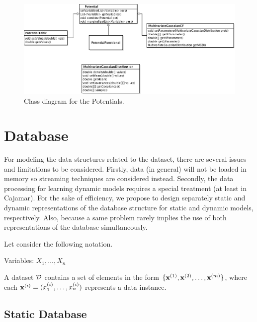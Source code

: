 \documentclass[a4paper,12pt]{article}
\begin{document}
\begin{figure}[h]
\includegraphics[width=\textwidth]{Potential}
\caption{Class diagram for the Potentials.}
\label{fig:classDiagramPotentials}
\end{figure}


\section{Database}

For modeling the data structures related to the dataset, there are several issues 
and limitations to be considered. Firstly, data (in general) will not be loaded in memory so streaming
techniques are considered instead. 
Secondly, the data processing for learning dynamic models requires a special treatment (at least in Cajamar).
For the sake of efficiency, we propose to design separately static and 
dynamic representations of the database structure for static and dynamic models, respectively. 
Also, because a same problem rarely implies the use of both representations of the database simultaneously.

Let consider the following notation. 

Variables: $X_1, \ldots, X_n$

A dataset $\cal{D}$ contains a set of elements in the form $\{\x^{(1)}, \x^{(2)},\ldots, \x^{(m)}\}$, 
where each $\x^{(i)}=(x_1^{(i)}, \ldots, x_n^{(i)})$ represents a data instance.






\subsection{Static Database}
\label{subsec:staticDatabase}
\end{document}
